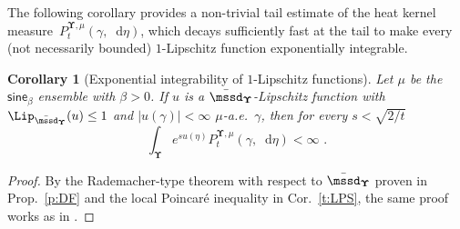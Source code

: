 \documentclass[11pt,letterpaper]{amsart}
\newcommand{\sem}[1]{\{#1\}_{t \ge 0}}
\newcommand{\diff}{\mathop{}\!\mathrm{d}}
\newcommand{\comma}{\,\,\mathrm{,}\;\,}
\newcommand{\fstop}{\,\,\mathrm{.}}
\newcommand{\purple}[1]{{\color{purple}#1}}
\newcommand{\QP}{{\mu}}
\newcommand{\dUpsilon}{{\mathbf \Upsilon}}
\newcommand{\U}{\dUpsilon}
\newcommand{\sine}{\mathsf{sine}}
\renewcommand{\1}{\mathbf 1}
\numberwithin{equation}{section}
\theoremstyle{plain}
\newtheorem{cor}[thm]{Corollary}%
\theoremstyle{definition}
\theoremstyle{remark}
\begin{document}
The following corollary provides a non-trivial tail estimate of the heat kernel measure~$P_t^{\U, \QP}(\gamma, \diff \eta)$, which decays sufficiently fast at the tail to make every (not necessarily bounded) $1$-Lipschitz function exponentially integrable. 
\begin{cor}[Exponential integrability of $1$-Lipschitz functions] \label{c:TES}
Let $\mu$ be the $\sine_\beta$ ensemble with $\beta>0$. 
 If $u$ is a $\bar{\mssd}_\U$-Lipschitz function with $\Lip_{\bar{\mssd}_\U}(u) \le 1$ and $|u(\gamma)|<\infty$ $\QP$-a.e.~$\gamma$, then for every $s<\sqrt{2/t}$
$$\int_{\U} e^{s u(\eta)} P_t^{\U, \QP}(\gamma, \diff \eta)<\infty \fstop$$
\end{cor}
\begin{proof}
By the Rademacher-type theorem with respect to $\bar{\mssd}_\U$ proven in Prop.~\ref{p:DF} and the local Poincar\'e inequality in Cor.~\ref{t:LPS}, the same proof works as in \cite[Prop.~4.4.2]{BakGenLed14}.
\end{proof}
\end{document}
